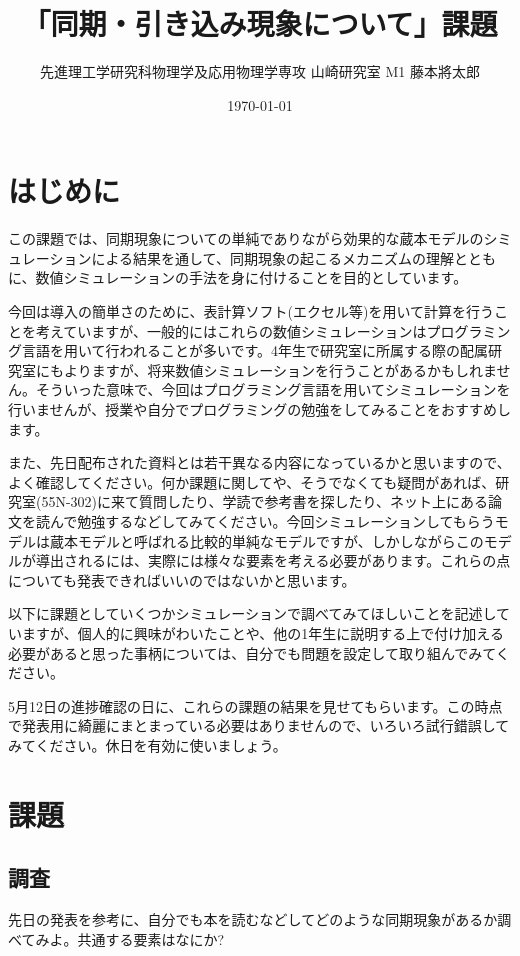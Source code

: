 \documentclass{jsarticle}
\title{「同期・引き込み現象について」課題}
\author{先進理工学研究科物理学及応用物理学専攻 山崎研究室 M1 藤本將太郎}
\date{\today}
\begin{document}
\maketitle

\section{はじめに}
この課題では、同期現象についての単純でありながら効果的な蔵本モデルのシミュレーションによる結果を通して、同期現象の起こるメカニズムの理解とともに、数値シミュレーションの手法を身に付けることを目的としています。

今回は導入の簡単さのために、表計算ソフト(エクセル等)を用いて計算を行うことを考えていますが、一般的にはこれらの数値シミュレーションはプログラミング言語を用いて行われることが多いです。4年生で研究室に所属する際の配属研究室にもよりますが、将来数値シミュレーションを行うことがあるかもしれません。そういった意味で、今回はプログラミング言語を用いてシミュレーションを行いませんが、授業や自分でプログラミングの勉強をしてみることをおすすめします。

また、先日配布された資料とは若干異なる内容になっているかと思いますので、よく確認してください。何か課題に関してや、そうでなくても疑問があれば、研究室(55N-302)に来て質問したり、学読で参考書を探したり、ネット上にある論文を読んで勉強するなどしてみてください。今回シミュレーションしてもらうモデルは蔵本モデルと呼ばれる比較的単純なモデルですが、しかしながらこのモデルが導出されるには、実際には様々な要素を考える必要があります。これらの点についても発表できればいいのではないかと思います。

以下に課題としていくつかシミュレーションで調べてみてほしいことを記述していますが、個人的に興味がわいたことや、他の1年生に説明する上で付け加える必要があると思った事柄については、自分でも問題を設定して取り組んでみてください。

5月12日の進捗確認の日に、これらの課題の結果を見せてもらいます。この時点で発表用に綺麗にまとまっている必要はありませんので、いろいろ試行錯誤してみてください。休日を有効に使いましょう。

\section{課題}

\subsection{調査}
    先日の発表を参考に、自分でも本を読むなどしてどのような同期現象があるか調べてみよ。共通する要素はなにか?
\end{document}

